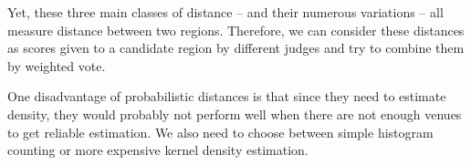 Yet, these three main classes of distance -- and their numerous variations --
all measure distance between two regions. Therefore, we can consider these
distances as scores given to a candidate region by different judges and try to
combine them by weighted vote.

One disadvantage of probabilistic distances is that since they need to
estimate density, they would probably not perform well when there are not
enough venues to get reliable estimation.  We also need to choose between
simple histogram counting or more expensive kernel density estimation.
